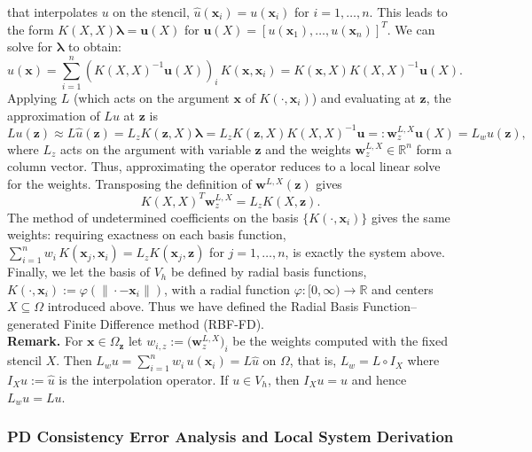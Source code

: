 \documentclass[11pt]{article}
\begin{document}
that interpolates $u$ on the stencil, $\hat{u}(\bm{x}_i) = u(\bm{x}_i)$ for $i = 1, \dots, n$. This leads to the form $K(X,X) \bm{\lambda} = \bm{u}(X)$ for $\bm{u}(X) = [ u(\bm{x}_1), \dots, u(\bm{x}_n) ]^T$. We can solve for $\bm{\lambda}$ to obtain:
\begin{equation*}
	\hat{u}(\bm{x}) = \sum_{i=1}^n (K(X,X)^{-1} \bm{u}(X))_i \, K(\bm{x},\bm{x}_i) = K(\bm{x},X) K(X,X)^{-1} \bm{u}(X).
\end{equation*}
Applying $L$ (which acts on the argument $\bm{x}$ of $K(\cdot,\bm{x}_i)$) and evaluating at $\bm{z}$, the approximation of $Lu$ at $\bm{z}$ is
\begin{equation}
	Lu (\bm{z}) \approx L \hat{u} (\bm{z}) = L_z K(\bm{z},X) \bm{\lambda} = L_z K(\bm{z},X) K(X,X)^{-1} \bm{u} =: \bm{w}_z^{L, X} \bm{u}(X) = L_w u(\bm{z}),
\end{equation}
where $L_z$ acts on the argument with variable $\bm{z}$ and the weights $\bm{w}_z^{L, X} \in \mathbb{R}^n$ form a column vector. Thus, approximating the operator reduces to a local linear solve for the weights. Transposing the definition of $\bm{w}^{L,X}(\bm{z})$ gives
\begin{equation}
	K(X,X)^T \bm{w}_z^{L, X} = L_z K(X,\bm{z}).
	\label{eq:pd_local}
\end{equation}
The method of undetermined coefficients on the basis $\{K(\cdot,\bm{x}_i)\}$ gives the same weights: requiring exactness on each basis function, $\sum_{i=1}^n w_i \, K(\bm{x}_j, \bm{x}_i) = L_z K(\bm{x}_j, \bm{z})$ for $j = 1, \dots, n$, is exactly the system above. Finally, we let the basis of $V_h$ be defined by radial basis functions, $K(\cdot, \bm{x}_i):=\varphi(\| \cdot - \bm{x}_i \|)$, with a radial function $\varphi:[0,\infty) \rightarrow \mathbb{R}$ and centers $X \subseteq \Omega$ introduced above. Thus we have defined the Radial Basis Function--generated Finite Difference method (RBF-FD).
\\
\noindent\textbf{Remark.} For $\bm{x} \in \Omega_{\bm{z}}$ let $w_{i,z} := \bigl( \bm{w}^{L,X}_z \bigr)_i$ be the weights computed with the fixed stencil $X$. Then $L_w u = \sum_{i=1}^n w_i \, u(\bm{x}_i) = L\hat{u}$ on $\Omega$, that is, $L_w = L \circ I_X$ where $I_X u := \hat{u}$ is the interpolation operator. If $u \in V_h$, then $I_X u = u$ and hence $L_w u = Lu$.

\subsubsection{PD Consistency Error Analysis and Local System Derivation}
\end{document}
